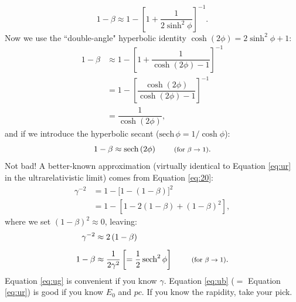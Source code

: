 \documentclass[12pt]{article}
\begin{document}
\begin{equation*}
1 - \beta \approx 1 - \left[ 1 + \dfrac{1}{2 \sinh^2{\phi}} \right]^{-1} .
\end{equation*}
Now we use the ``double-angle" hyperbolic identity $\cosh{(2 \phi)} = 2 \sinh^2{\phi} + 1$:
\begin{equation*}
\begin{split}
1 - \beta & \approx 1 - \left[ 1 + \dfrac{1}{\cosh{(2 \phi)} - 1} \right]^{-1} \\[5pt]
& = 1 - \left[ \dfrac{\cosh{(2 \phi)}}{\cosh{(2 \phi)} - 1} \right]^{-1} \\[7pt]
&= \dfrac{1}{\cosh{(2 \phi)}} ,
\end{split}
\end{equation*}
and if we introduce the hyperbolic secant ($\text{sech} \, \phi = 1 / \cosh{\phi}$):
\begin{equation}\label{eq:ur}
1 - \beta \approx \text{sech} \, (2 \phi) \qquad \textrm{\footnotesize{ (for $\beta \rightarrow 1$)}}.
\end{equation}
Not bad! A better-known approximation (virtually identical to Equation \ref{eq:ur} in the ultrarelativistic limit) comes from Equation \ref{eq:20}:
\begin{equation*}
\begin{split}
\gamma^{-2} &= 1 - \bigl[ 1 - \left( 1 - \beta \right) \bigr]^2 \\
& = 1 - \left[ 1 - 2 \left( 1 - \beta \right) + \left( 1 - \beta \right)^2 \right],
\end{split}
\end{equation*}
where we set $(1 - \beta)^2 \approx 0$, leaving:
\begin{equation}\label{eq:ug}
\begin{split}
\gamma^{-2} & \approx 2 \left( 1 - \beta \right) \\[5pt]
1 - \beta & \approx \dfrac{1}{2 \gamma^2} \left [= \dfrac{1}{2} \, \text{sech}^2 \, \phi \right] \qquad \textrm{\footnotesize{ (for $\beta \rightarrow 1$)}}.
\end{split}
\end{equation}
Equation \ref{eq:ug} is convenient if you know $\gamma$. Equation \ref{eq:ub} ($=$ Equation \ref{eq:ur}) is good if you know $E_0$ and $p c$. If you know the rapidity, take your pick.
\end{document}
